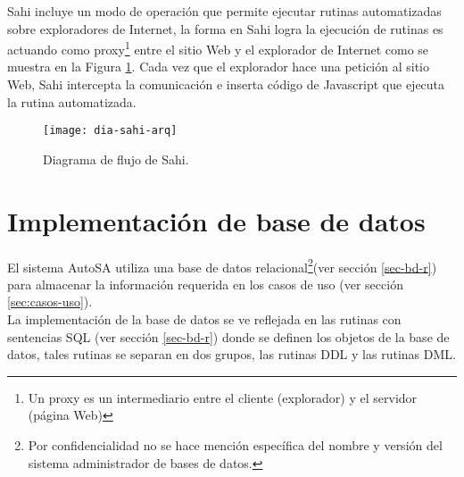 Sahi incluye un modo de operación que permite ejecutar rutinas automatizadas sobre exploradores de Internet, la forma en Sahi logra la ejecución de rutinas es actuando como proxy\footnote{Un proxy es un intermediario entre el cliente (explorador) y el servidor (página Web)\cite{BeginningUbuntuLinux}} entre el sitio Web y el explorador de Internet como se muestra en la Figura \ref{fig:dia-sahi-arq}. Cada vez que el explorador hace una petición al sitio Web, Sahi intercepta la comunicación e inserta código de Javascript que ejecuta la rutina automatizada.\cite{WebEng9IntConf, SahiPro}

\begin{figure}[h]
\centering
\texttt{[image: dia-sahi-arq]}
\caption{Diagrama de flujo de Sahi\cite{SahiPro}.}
\label{fig:dia-sahi-arq}
\end{figure}


%

\section{Implementación de base de datos}
El sistema AutoSA utiliza una base de datos relacional\footnote{Por confidencialidad no se hace mención específica del nombre y versión del sistema administrador de bases de datos.}(ver sección \ref{sec-bd-r}) para almacenar la información requerida en los casos de uso (ver sección \ref{sec:casos-uso}).\\
La implementación de la base de datos se ve reflejada en las rutinas con sentencias SQL (ver sección \ref{sec-bd-r}) donde se definen los objetos de la base de datos, tales rutinas se separan en dos grupos, las rutinas DDL y las rutinas DML.

